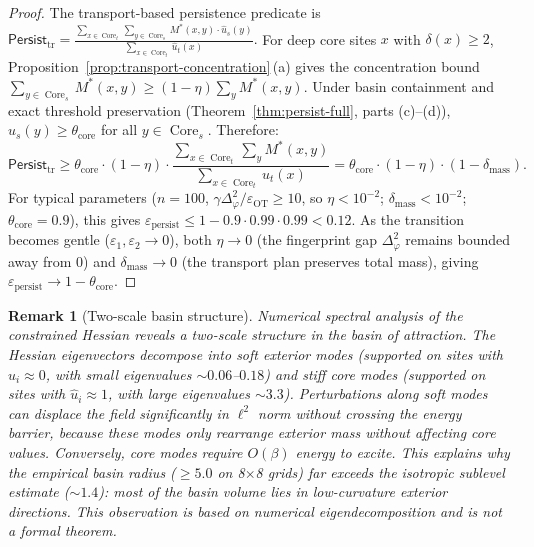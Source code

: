 \documentclass[lettersize,journal]{IEEEtran}
\newtheorem{remark}{Remark}
\DeclareMathOperator{\Core}{Core}
\begin{document}
\begin{proof}
The transport-based persistence predicate is
$\mathsf{Persist}_{\mathrm{tr}} = \frac{\sum_{x \in \Core_t} \sum_{y \in \Core_s} M^*(x,y) \cdot \hat{u}_s(y)}{\sum_{x \in \Core_t} \hat{u}_t(x)}.$
For deep core sites $x$ with $\delta(x) \geq 2$, Proposition~\ref{prop:transport-concentration}\,(a) gives the concentration bound $\sum_{y \in \Core_s} M^*(x,y) \geq (1 - \eta) \sum_y M^*(x,y)$. Under basin containment and exact threshold preservation (Theorem~\ref{thm:persist-full}, parts (c)--(d)), $\hat{u}_s(y) \geq \theta_{\mathrm{core}}$ for all $y \in \Core_s$. Therefore:
\[
\mathsf{Persist}_{\mathrm{tr}} \geq \theta_{\mathrm{core}} \cdot (1 - \eta) \cdot \frac{\sum_{x \in \Core_t} \sum_y M^*(x,y)}{\sum_{x \in \Core_t} \hat{u}_t(x)} = \theta_{\mathrm{core}} \cdot (1 - \eta) \cdot (1 - \delta_{\mathrm{mass}}).
\]
For typical parameters ($n = 100$, $\gamma \Delta_\varphi^2 / \varepsilon_{\mathrm{OT}} \geq 10$, so $\eta < 10^{-2}$; $\delta_{\mathrm{mass}} < 10^{-2}$; $\theta_{\mathrm{core}} = 0.9$), this gives $\varepsilon_{\mathrm{persist}} \leq 1 - 0.9 \cdot 0.99 \cdot 0.99 < 0.12$.
As the transition becomes gentle ($\varepsilon_1, \varepsilon_2 \to 0$), both $\eta \to 0$ (the fingerprint gap $\Delta_\varphi^2$ remains bounded away from 0) and $\delta_{\mathrm{mass}} \to 0$ (the transport plan preserves total mass), giving $\varepsilon_{\mathrm{persist}} \to 1 - \theta_{\mathrm{core}}$.
\end{proof}

\begin{remark}[Two-scale basin structure]
\label{rmk:two-scale-basin}
Numerical spectral analysis of the constrained Hessian reveals a two-scale structure in the basin of attraction. The Hessian eigenvectors decompose into \emph{soft exterior modes} (supported on sites with $\hat{u}_i \approx 0$, with small eigenvalues $\sim 0.06$--$0.18$) and \emph{stiff core modes} (supported on sites with $\hat{u}_i \approx 1$, with large eigenvalues $\sim 3.3$). Perturbations along soft modes can displace the field significantly in $\ell^2$ norm without crossing the energy barrier, because these modes only rearrange exterior mass without affecting core values. Conversely, core modes require $O(\beta)$ energy to excite. This explains why the empirical basin radius ($\geq 5.0$ on 8$\times$8 grids) far exceeds the isotropic sublevel estimate ($\sim 1.4$): most of the basin volume lies in low-curvature exterior directions. This observation is based on numerical eigendecomposition and is not a formal theorem.
\end{remark}
\end{document}
